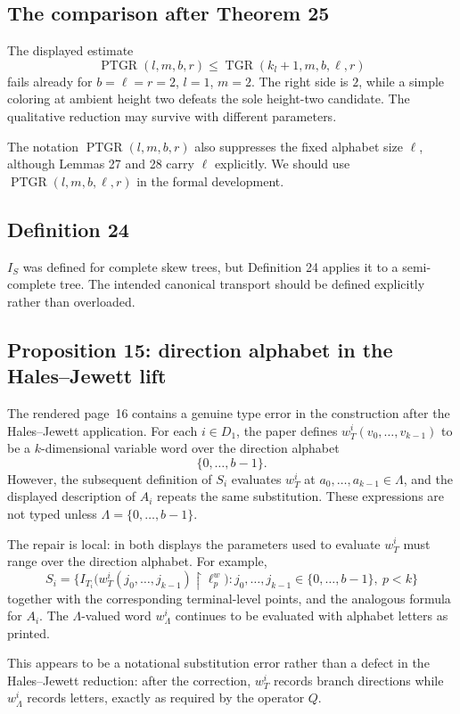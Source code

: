 \documentclass[11pt]{article}
\begin{document}
\subsection{The comparison after Theorem 25}
The displayed estimate
\[
\operatorname{PTGR}(l,m,b,r)
\le \operatorname{TGR}(k_l+1,m,b,\ell,r)
\]
fails already for $b=\ell=r=2$, $l=1$, $m=2$.  The right side is $2$, while a
simple coloring at ambient height two defeats the sole height-two candidate.
The qualitative reduction may survive with different parameters.

The notation $\operatorname{PTGR}(l,m,b,r)$ also suppresses the fixed alphabet
size $\ell$, although Lemmas 27 and 28 carry $\ell$ explicitly.  We should use
$\operatorname{PTGR}(l,m,b,\ell,r)$ in the formal development.

\subsection{Definition 24}
$I_S$ was defined for complete skew trees, but Definition 24 applies it to a
semi-complete tree.  The intended canonical transport should be defined
explicitly rather than overloaded.

\subsection{Proposition 15: direction alphabet in the Hales--Jewett lift}
The rendered page~16 contains a genuine type error in the construction after
the Hales--Jewett application.  For each $i\in D_1$, the paper defines
$w_T^i(v_0,\ldots,v_{k-1})$ to be a $k$-dimensional variable word over the
direction alphabet
\[
\{0,\ldots,b-1\}.
\]
However, the subsequent definition of $S_i$ evaluates $w_T^i$ at
$a_0,\ldots,a_{k-1}\in\Lambda$, and the displayed description of $A_i$ repeats
the same substitution.  These expressions are not typed unless
$\Lambda=\{0,\ldots,b-1\}$.

The repair is local: in both displays the parameters used to evaluate
$w_T^i$ must range over the direction alphabet.  For example,
\[
S_i=
\bigl\{
 I_{T_i}\bigl(w_T^i(j_0,\ldots,j_{k-1})\upharpoonright \ell_p^w\bigr)
 :
 j_0,\ldots,j_{k-1}\in\{0,\ldots,b-1\},\ p<k
\bigr\}
\]
together with the corresponding terminal-level points, and the analogous
formula for $A_i$.  The $\Lambda$-valued word $w_\Lambda^i$ continues to be
evaluated with alphabet letters as printed.

This appears to be a notational substitution error rather than a defect in the
Hales--Jewett reduction: after the correction, $w_T^i$ records branch
directions while $w_\Lambda^i$ records letters, exactly as required by the
operator $Q$.
\end{document}
